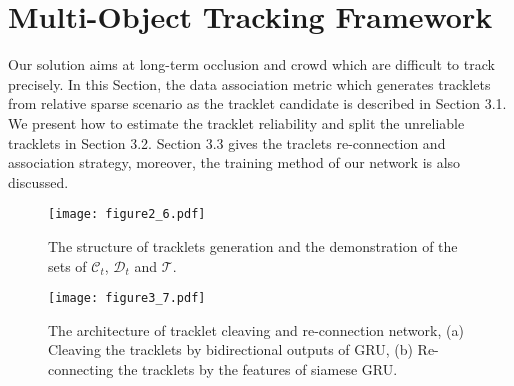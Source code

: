 \documentclass[5pt]{article}
\begin{document}
\vspace{-0.1cm}
\section{Multi-Object Tracking Framework}
\vspace{-0.1cm}
Our solution aims at long-term occlusion and crowd which are difficult to track precisely. In this Section, the data association metric which generates tracklets from relative sparse scenario as the tracklet candidate is described in Section 3.1. We present how to estimate the tracklet reliability and split the unreliable tracklets in Section 3.2. Section 3.3 gives the traclets re-connection and association strategy, moreover, the training method of our network is also discussed.

\begin{figure}[h]
    \centering
    \texttt{[image: figure2\_6.pdf]}
    \vspace{-0.2cm}
    \caption{The structure of tracklets generation and the demonstration of the sets of $\mathcal{C}_{t}$, $\mathcal{D}_{t}$ and $\mathcal{T}$.}
\vspace{-0.5cm}
\end{figure}
\begin{figure*}
    \centering
    \texttt{[image: figure3\_7.pdf]}
    \vspace{-0.3cm}
    \caption{The architecture of tracklet cleaving and re-connection network, (a) Cleaving the tracklets by bidirectional outputs of GRU, (b) Re-connecting the tracklets by the features of siamese GRU.}
    \label{Fig13}
\vspace{-0.5cm}
\end{figure*}
\end{document}
